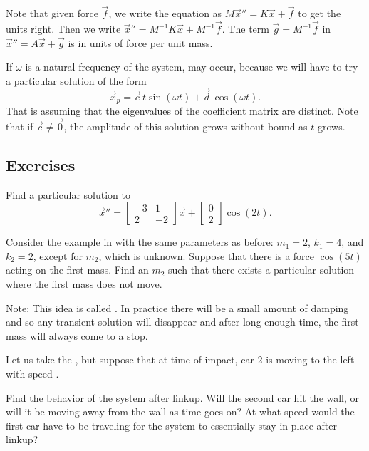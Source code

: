 Note that given force $\vec{f}$, we write 
the equation as $M {\vec{x}}'' = K \vec{x} + \vec{f}$ to get the units
right. Then we write
${\vec{x}}'' = M^{-1}K \vec{x} + M^{-1}\vec{f}$.  The 
term $\vec{g} = M^{-1} \vec{f}$ in ${\vec{x}}'' = A \vec{x} + \vec{g}$ is in units of force
per unit mass.

If $\omega$ is a natural frequency of the system,
\emph{} may occur,
because we will have to try a particular solution of the form
\begin{equation*}
\vec{x}_p =
\vec{c} \, t \sin (\omega t) +
\vec{d} \, \cos (\omega t) .
\end{equation*}
That is assuming that the eigenvalues of the coefficient matrix are distinct.
Note that if $\vec{c} \neq \vec{0}$, the amplitude of this solution grows without bound as $t$ grows.

\subsection{Exercises}

\begin{exercise}
Find a particular solution to
\begin{equation*}
{\vec{x}}'' =
\begin{bmatrix}
-3 & 1 \\
2 & -2
\end{bmatrix}
\vec{x} 
+ 
\begin{bmatrix}
0 \\ 2
\end{bmatrix}
\cos (2 t) .
\end{equation*}
\end{exercise}

\begin{exercise}[challenging]
Consider the example in  with
the same parameters as before:
$m_1 = 2$, $k_1 = 4$, and $k_2 = 2$, except for $m_2$, which is unknown.
Suppose that there is a force $\cos (5 t)$ acting on the first mass.
Find an $m_2$ such that there exists a particular solution where the
first mass does not move.

Note: This idea is called \emph{}.
In practice there will be a small amount of
damping and so any transient solution will disappear and after long enough
time, the first mass will always come to a stop.
\end{exercise}

\begin{exercise}
Let us take the , but suppose that at
time of impact, car 2 is moving to the left with speed
.
\begin{tasks}
\task
Find the behavior of the system after linkup.
\task
Will the second car hit
the wall, or will it be moving away from the wall as time goes on?
\task
At
what speed would the first car have to be traveling for the system to
essentially stay in place after linkup?
\end{tasks}
\end{exercise}

